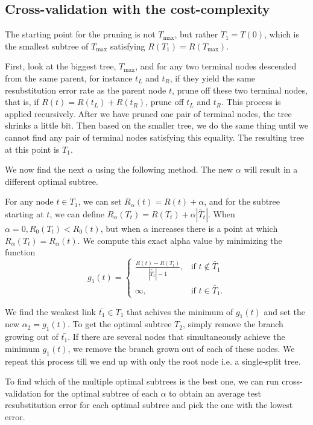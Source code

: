 \subsection{Cross-validation with the cost-complexity}

The starting point for the pruning is not $T_{\text{max}}$, but rather
$T_1 = T(0)$, which is the smallest subtree of $T_{\text{max}}$ satisfying
$R(T_1) = R(T_{\text{max}})$.

First, look at the biggest tree, $T_{\text{max}}$, and for any two terminal
nodes descended from the same parent, for instance $t_L$ and $t_R$, if they
yield the same resubstitution error rate as the parent node $t$, prune off these
two terminal nodes, that is, if $R(t) = R(t_L) + R(t_R)$, prune off $t_L$ and
$t_R$. This process is applied recursively. After we have pruned one pair of
terminal nodes, the tree shrinks a little bit. Then based on the smaller tree,
we do the same thing until we cannot find any pair of terminal nodes satisfying
this equality. The resulting tree at this point is $T_1$.

We now find the next $\alpha$ using the following method. The new
$\alpha$ will result in a different optimal subtree.

For any node $t \in T_1$, we can set $R_\alpha({t}) = R(t) + \alpha$, and for
the subtree starting at $t$, we can define $R_\alpha(T_t) = R(T_t) + \alpha |\tilde{T_t}|$.
When $\alpha = 0, R_0(T_t) < R_0({t})$, but when $\alpha$ increases there is a point
at which $R_\alpha(T_t) = R_\alpha({t})$. We compute this exact alpha value by minimizing the
function
\begin{equation*}
    g_1(t) = \begin{cases}
                \frac{R(t) - R(T_t)}{|\tilde{T_t}| - 1},  & \mbox{if } t \notin \tilde{T_1} \\
                \infty, & \mbox{if } t \in \tilde{T_1}.
             \end{cases}
\end{equation*}

We find the weakest link $\bar{t_1} \in T_1$ that achives the minimum of
$g_1(t)$  and set the new $\alpha_2 = g_1(t)$. To get the optimal subtree $T_2$,
simply remove the branch growing out of $\bar{t_1}$. If there are several nodes
that simultaneously achieve the minimum $g_1(t)$, we remove the branch grown out of
each of these nodes. We repeat this process till we end up with only the root
node i.e. a single-split tree.

To find which of the multiple optimal subtrees is the best one, we can run
cross-validation for the optimal subtree of each $\alpha$ to obtain an average
test resubstitution error for each optimal subtree and pick the one with the
lowest error.

